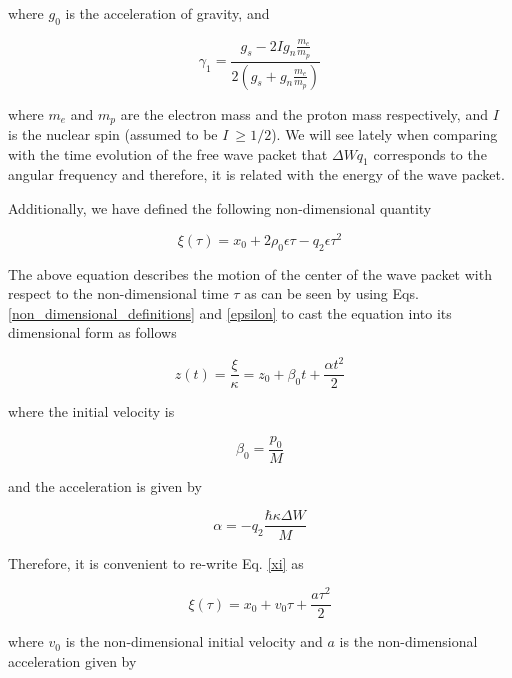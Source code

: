 \documentclass{article}
\begin{document}
where $g_{0}$ is the acceleration of gravity, and 

\begin{equation}\label{gamma_1}
\gamma_{1} = \frac{g_{s}-2 I g_{n} \frac{m_{e}}{m_{p}}}{2(g_{s}+g_{n}\frac{m_{e}}{m_{p}})}
\end{equation}

where $m_{e}$ and $m_{p}$ are the electron mass and the proton mass respectively, and $I$ is the nuclear spin (assumed to be $I\ \ge 1/2$).
We will see lately when comparing with the time evolution of the free wave packet that $\Delta W q_{1}$ corresponds to the angular frequency and therefore, it is related with the energy of the wave packet.


Additionally, we have defined the following non-dimensional quantity

\begin{equation}\label{xi}
\xi(\tau) = x_{0} + 2 \rho_{0} \epsilon \tau - q_{2}\epsilon \tau^{2}
\end{equation}

The above equation describes the motion of the center of the wave packet with respect to the non-dimensional time $\tau$ as can be seen by using Eqs. \ref{non_dimensional_definitions} and \ref{epsilon} to cast the equation into its dimensional form as follows

\begin{equation}\label{xi_dimensional}
z(t) = \frac{\xi}{\kappa} = z_{0} +  \beta_{0} t +  \frac{\alpha t^{2}}{2}
\end{equation}

where the initial velocity is

\begin{equation}
\beta_{0} = \frac{p_{0}}{M}
\end{equation}

and the acceleration is given by

\begin{equation}\label{q2_a}
\alpha = -q_{2} \frac{ \hbar \kappa \Delta W}{M}
\end{equation}

Therefore, it is convenient to re-write Eq. \ref{xi} as

\begin{equation}\label{xi_eq_motion}
\xi(\tau) = x_{0} + v_{0} \tau + \frac{a \tau^{2}}{2}
\end{equation}

where $v_{0}$ is the non-dimensional initial velocity and $a$ is the non-dimensional acceleration given by
\end{document}
